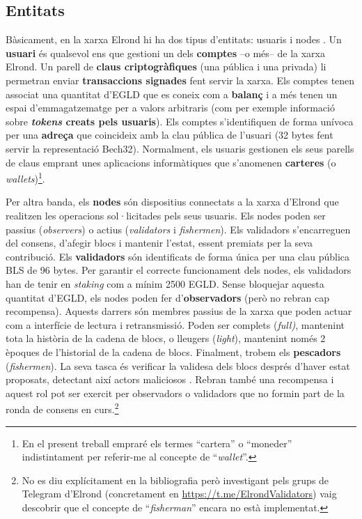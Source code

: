 \documentclass[11pt,a4paper]{article}
\begin{document}
\subsection{Entitats}
\label{sub:entitat}
Bàsicament, en la xarxa Elrond hi ha dos tipus d'entitats: usuaris i nodes \cite{elrond2022}. Un \textbf{usuari} és qualsevol ens que gestioni un dels \textbf{comptes} –o més– de la xarxa Elrond. Un parell de \textbf{claus criptogràfiques} (una pública i una privada) li permetran enviar \textbf{transaccions signades} fent servir la xarxa. Els comptes tenen associat una quantitat d'EGLD que es coneix com a \textbf{balanç} i a més tenen un espai d'emmagatzematge per a valors arbitraris (com per exemple informació sobre \textbf{\textit{tokens} creats pels usuaris}). Els comptes s'identifiquen de forma unívoca per una \textbf{adreça} que coincideix amb la clau pública de l'usuari (32 bytes fent servir la representació Bech32). Normalment, els usuaris gestionen els seus parells de claus emprant unes aplicacions informàtiques que s'anomenen \textbf{carteres} (o \textit{wallets})\footnote{En el present treball empraré els termes ``cartera'' o ``moneder'' indistintament per referir-me al concepte de ``\textit{wallet}''.}.

Per altra banda, els \textbf{nodes} són dispositius connectats a la xarxa d'Elrond que realitzen les operacions sol·licitades pels seus usuaris. Els nodes poden ser passius (\textit{observers}) o actius (\textit{validators} i \textit{fishermen}). Els validadors s'encarreguen del consens, d'afegir blocs i mantenir l'estat, essent premiats per la seva contribució. Els \textbf{validadors} són identificats de forma única per una clau pública BLS de 96 bytes. Per garantir el correcte funcionament dels nodes, els validadors han de tenir en \textit{staking} com a mínim 2500 EGLD. Sense bloquejar aquesta quantitat d'EGLD, els nodes poden fer d'\textbf{observadors} (però no rebran cap recompensa). Aquests darrers són membres passius de la xarxa que poden actuar com a interfície de lectura i retransmissió. Poden ser complets (\textit{full)}, mantenint tota la història de la cadena de blocs, o lleugers (\textit{light}), mantenint només 2 èpoques de l'historial de la cadena de blocs. Finalment, trobem els \textbf{pescadors} (\textit{fishermen}). La seva tasca és verificar la validesa dels blocs després d'haver estat proposats, detectant així actors maliciosos \cite{elrond2022-2}. Rebran també una recompensa i aquest rol pot ser exercit per observadors o validadors que no formin part de la ronda de consens en curs.\footnote{No es diu explícitament en la bibliografia però investigant pels grups de Telegram d'Elrond (concretament en \url{https://t.me/ElrondValidators}) vaig descobrir que el concepte de ``\textit{fisherman}'' encara no està implementat.}
\end{document}
